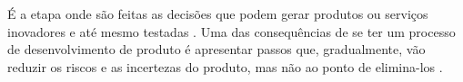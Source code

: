 É a etapa onde são feitas as decisões que podem gerar produtos ou serviços inovadores e até mesmo testadas \cite{verganti2020innovation}. Uma das consequências de se ter um processo de desenvolvimento de produto é apresentar passos que, gradualmente, vão reduzir os riscos e as incertezas do produto, mas não ao ponto de elimina-los \cite{baxter2018product}. 